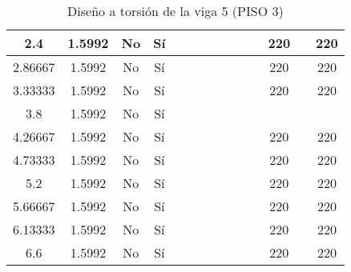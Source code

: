 \begin{table}[H]
{\begin{tabular}{|c|c|c|c|c|c|c|c|c|c|c|c|c|c|}
\hline
2.4 & 1.5992 & No  & Sí  &     &     &     &     &     &     &     & 220 &     & 220 \bigstrut\\
\hline
2.86667 & 1.5992 & No  & Sí  &     &     &     &     &     &     &     & 220 &     & 220 \bigstrut\\
\hline
3.33333 & 1.5992 & No  & Sí  &     &     &     &     &     &     &     & 220 &     & 220 \bigstrut\\
\hline
3.8 & 1.5992 & No  & Sí  &     &     &     &     &     &     &     &     &     &  \bigstrut\\
\hline
4.26667 & 1.5992 & No  & Sí  &     &     &     &     &     &     &     & 220 &     & 220 \bigstrut\\
\hline
4.73333 & 1.5992 & No  & Sí  &     &     &     &     &     &     &     & 220 &     & 220 \bigstrut\\
\hline
5.2 & 1.5992 & No  & Sí  &     &     &     &     &     &     &     & 220 &     & 220 \bigstrut\\
\hline
5.66667 & 1.5992 & No  & Sí  &     &     &     &     &     &     &     & 220 &     & 220 \bigstrut\\
\hline
6.13333 & 1.5992 & No  & Sí  &     &     &     &     &     &     &     & 220 &     & 220 \bigstrut\\
\hline
6.6 & 1.5992 & No  & Sí  &     &     &     &     &     &     &     & 220 &     & 220 \bigstrut\\
\hline
\end{tabular}%


  }
      \caption{Diseño a torsión de la viga 5 (PISO 3) }
  \label{tab:T VG5 P3 }%
\end{table}%
